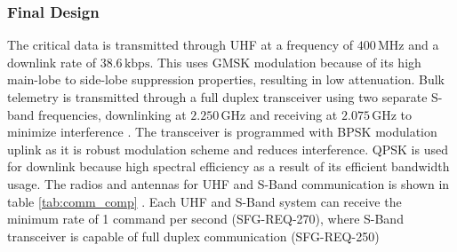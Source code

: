 \documentclass[a4paper, 11pt, conference]{IEEEtran}
\begin{document}
\subsubsection{Final Design}
The critical data is transmitted through UHF at a frequency of $400\,\mathrm{MHz}$ and a downlink rate of $38.6\,\mathrm{kbps}$. This uses GMSK modulation because of its high main-lobe to side-lobe suppression properties, resulting in low attenuation. Bulk telemetry is transmitted through a full duplex transceiver using two separate S-band frequencies, downlinking at $2.250\,\mathrm{GHz}$ and receiving at $2.075\,\mathrm{GHz}$ to minimize interference . The transceiver is programmed with BPSK modulation uplink as it is robust  modulation scheme and reduces interference. QPSK is used for downlink because high spectral efficiency as a result of its efficient bandwidth usage. The radios and antennas  for UHF and S-Band communication is shown in table \ref{tab:comm_comp} . Each UHF and S-Band system can receive the minimum  rate of 1 command per second (SFG-REQ-270), where S-Band transceiver is capable of full duplex communication (SFG-REQ-250)
\end{document}
